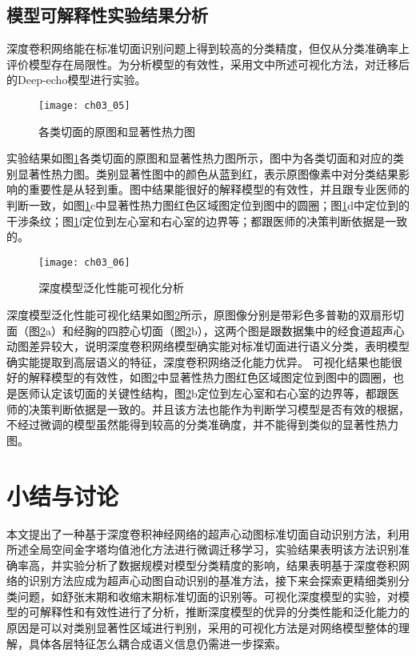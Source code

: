 \subsection{模型可解释性实验结果分析}
深度卷积网络能在标准切面识别问题上得到较高的分类精度，但仅从分类准确率上评价模型存在局限性。为分析模型的有效性，采用文中所述可视化方法，对迁移后的Deep-echo模型进行实验。
\begin{figure}[!htbp]
\centering
\texttt{[image: ch03\_05]}
\caption{各类切面的原图和显著性热力图}
\label{fig:ch03_05}
\end{figure}  
实验结果如图\ref{fig:ch03_05}各类切面的原图和显著性热力图所示，图中为各类切面和对应的类别显著性热力图。类别显著性图中的颜色从蓝到红，表示原图像素中对分类结果影响的重要性是从轻到重。图中结果能很好的解释模型的有效性，并且跟专业医师的判断一致，如图\ref{fig:ch03_05}c中显著性热力图红色区域图定位到图中的圆圈；图\ref{fig:ch03_05}d中定位到的干涉条纹；图\ref{fig:ch03_05}f定位到左心室和右心室的边界等；都跟医师的决策判断依据是一致的。
\begin{figure}[!htbp]
\centering
\texttt{[image: ch03\_06]}
\caption{深度模型泛化性能可视化分析}
\label{fig:ch03_06}
\end{figure}    
深度模型泛化性能可视化结果如图\ref{fig:ch03_06}所示，原图像分别是带彩色多普勒的双扇形切面（图\ref{fig:ch03_06}a）和经胸的四腔心切面（图\ref{fig:ch03_06}b），这两个图是跟数据集中的经食道超声心动图差异较大，说明深度卷积网络模型确实能对标准切面进行语义分类，表明模型确实能提取到高层语义的特征，深度卷积网络泛化能力优异。
可视化结果也能很好的解释模型的有效性，如图\ref{fig:ch03_06}中显著性热力图红色区域图定位到图中的圆圈，也是医师认定该切面的关键性结构，图\ref{fig:ch03_06}b定位到左心室和右心室的边界等，都跟医师的决策判断依据是一致的。并且该方法也能作为判断学习模型是否有效的根据，不经过微调的模型虽然能得到较高的分类准确度，并不能得到类似的显著性热力图。

\section{小结与讨论}

本文提出了一种基于深度卷积神经网络的超声心动图标准切面自动识别方法，利用所述全局空间金字塔均值池化方法进行微调迁移学习，实验结果表明该方法识别准确率高，并实验分析了数据规模对模型分类精度的影响，结果表明基于深度卷积网络的识别方法应成为超声心动图自动识别的基准方法，接下来会探索更精细类别分类问题，如舒张末期和收缩末期标准切面的识别等。可视化深度模型的实验，对模型的可解释性和有效性进行了分析，推断深度模型的优异的分类性能和泛化能力的原因是可以对类别显著性区域进行判别，采用的可视化方法是对网络模型整体的理解，具体各层特征怎么耦合成语义信息仍需进一步探索。




